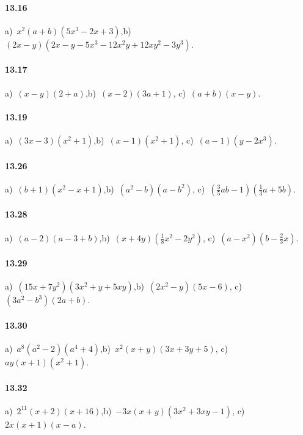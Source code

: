 \paragraph{13.16}
a)~$x^{2}(a+b)(5x^{3}-2x+3)$,\quad b)~$(2x-y)\left(2x-y-5x^3-12x^2y+12xy^2-3y^3\right)$.

\paragraph{13.17}
a)~$(x-y)(2+a)$,\quad b)~$(x-2)(3a+1)$, \quad c)~$(a+b)(x-y)$.

\paragraph{13.19}
a)~$(3x-3)\left(x^2+1\right)$,\quad b)~$(x-1)\left(x^{2}+1\right)$, \quad c)~$(a-1)\left(y-2x^{3}\right)$.

\paragraph{13.26}
a)~$(b+1)(x^{2}-x+1)$,\quad b)~$\left(a^{2}-b\right)\left(a-b^{2}\right)$, \quad c)~$\left(\frac{3}{5}ab-1\right)\left(\frac{1}{3}a+5b\right)$.

\paragraph{13.28}
a)~$(a-2)(a-3+b)$,\quad b)~$(x+4y)\left(\frac{1}{8}x^2-2y^2\right)$, \quad c)~$\left(a-x^2\right)\left(b-\frac{2}{3}x\right)$.

\paragraph{13.29}
a)~$\left(15x+7y^{2}\right)\left(3x^{2}+y+5xy\right)$,\quad b)~$\left(2x^2-y\right)(5x-6)$, \quad c)~$(3a^2-b^3)(2a+b)$.

\paragraph{13.30}
a)~$a^{8}\left(a^{2}-2\right)\left(a^{4}+4\right)$,\quad b)~$x^{2}(x+y)(3x+3y+5)$, \quad c)~$ay(x+1)(x^{2}+1)$.

\paragraph{13.32}
a)~$2^{11}(x+2)(x+16)$,\quad b)~$-3x(x+y)\left(3x^2+3xy-1\right)$, \quad c)~$2x(x+1)(x-a)$.

